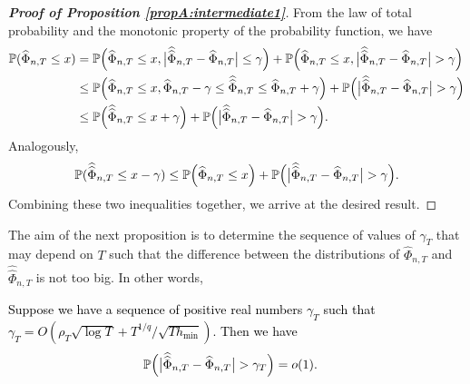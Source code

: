 \documentclass[a4paper,12pt]{article}
\newcommand{\doublehattwo}[1]{\widehat{\widehat{#1}}}
\begin{document}
\begin{proof}[\textnormal{\textbf{Proof of Proposition \ref{propA:intermediate1}}}] 
From the law of total probability and the monotonic property of the probability function, we have
\begin{align*} \pr(\widehat{\Phi}_{n, T} \le x) &= \pr \Big(\widehat{\Phi}_{n, T} \le x, \big|\doublehattwo{\Phi}_{n,T} - \widehat{\Phi}_{n,T}\big| \le \gamma \Big) + \pr \Big(\widehat{\Phi}_{n, T} \le x, \big|\doublehattwo{\Phi}_{n,T} - \widehat{\Phi}_{n,T}\big| > \gamma \Big) \\
& \le  \pr \Big(\widehat{\Phi}_{n, T} \le x, \widehat{\Phi}_{n,T} - \gamma \le \doublehattwo{\Phi}_{n,T} \le \widehat{\Phi}_{n,T} + \gamma \Big) + \pr \Big(\big|\doublehattwo{\Phi}_{n,T} - \widehat{\Phi}_{n,T}\big| > \gamma \Big) \\
& \le  \pr \Big(\doublehattwo{\Phi}_{n,T} \le x + \gamma \Big) + \pr \Big(\big|\doublehattwo{\Phi}_{n,T} - \widehat{\Phi}_{n,T}\big| > \gamma \Big).
\end{align*}
Analogously, 
\begin{align*} \pr(\doublehattwo{\Phi}_{n, T} \le x - \gamma)  \le  \pr \Big(\widehat{\Phi}_{n,T} \le x \Big) + \pr \Big(\big|\doublehattwo{\Phi}_{n,T} - \widehat{\Phi}_{n,T}\big| > \gamma \Big).
\end{align*}
Combining these two inequalities together, we arrive at the desired result.
\end{proof}

The aim of the next proposition is to determine the sequence of values of $\gamma_{T}$ that may depend on $T$ such that the difference between the distributions of $\widehat{\Phi}_{n, T}$ and $\doublehattwo{\Phi}_{n, T}$ is not too big. In other words,

\begin{propA}\label{propA:intermediate2}
\textcolor{black}{Suppose we have a sequence of positive real numbers $\gamma_T$ such that $\gamma_{T} = O(\rho_T \sqrt{\log T} + T^{1/q}/\sqrt{T h_{\min}})$. Then we have}
\begin{align}\label{eq-intermediate-relation-2}
\pr \Big(\big|\doublehattwo{\Phi}_{n,T} &- \widehat{\Phi}_{n,T}\big| > \gamma_{T} \Big) = o(1).
\end{align}
\end{propA}
\end{document}
